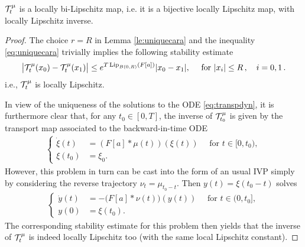 \begin{proposition}\label{p-transportlip}
$\mathcal{T}^\mu_t$ is a locally bi-Lipschitz map, i.e. it is a bijective locally Lipschitz map, with locally Lipschitz inverse.
\end{proposition}
\begin{proof}
	
 The choice $r = R$ in Lemma \ref{le:uniquecara} and the inequality \eqref{eq:uniquecara} trivially implies the following stability estimate
	\begin{align}\label{eq:liptrans}
		\bigl|\mathcal{T}^\mu_t(x_0)-\mathcal{T}^\mu_t(x_1)\bigr|
			\leq e^{T\,\textup{Lip}_{B(0,R)}(F[a])}|x_0-x_1|,\quad \text{ for } |x_i|\leq R\,,\quad i=0,1\,.
	\end{align}
	i.e., $\mathcal{T}^\mu_t$ is locally Lipschitz.
	
	In view of the uniqueness of the solutions to the ODE \eqref{eq:transpdyn}, it is furthermore clear that, for any $t_0\in [0,T]$, the inverse of $\mathcal{T}^\mu_{t_0}$ is
	given by the transport map associated to the backward-in-time ODE
\begin{align*}
\left\{\begin{aligned}
\dot{\xi}(t) &= (F[a]*\mu(t))(\xi(t)) \quad \text{ for } t \in [0,t_0),\\
\xi(t_0) &= \xi_0.
\end{aligned}\right.
\end{align*}
	However, this problem in turn can be cast into the form of an usual IVP simply by considering the reverse trajectory $\nu_t=\mu_{t_0-t}$. Then
	$y(t)=\xi(t_0-t)$ solves
	\begin{align*}
	\left\{\begin{aligned}
		\dot y(t)&=-\bigl(F[a]\ast\nu(t)\bigr)(y(t))  \quad \text{ for } t \in (0,t_0], \\
		y(0) &= \xi(t_0).
	\end{aligned}\right.
	\end{align*}
	The corresponding stability estimate for this problem then yields that the inverse of $\mathcal{T}^\mu_t$ is indeed
	locally Lipschitz too (with the same local Lipschitz constant).
\end{proof}



